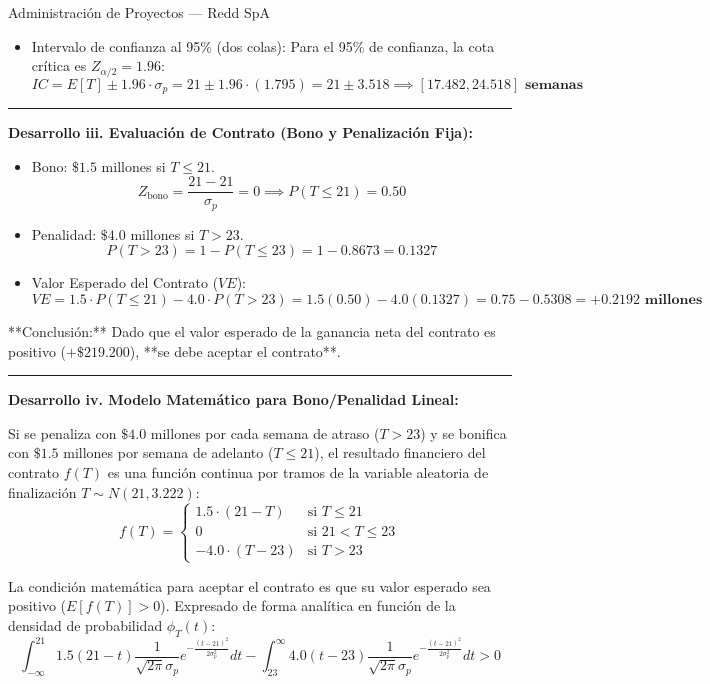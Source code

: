 \documentclass[11pt, a4paper]{article}
\begin{document}
\begin{ejercicio}{Administración de Proyectos --- Redd SpA}
\begin{itemize}
    \item Intervalo de confianza al 95\% (dos colas):
      Para el 95\% de confianza, la cota crítica es $Z_{\alpha/2} = 1.96$:
      \[
        IC = E[T] \pm 1.96 \cdot \sigma_p = 21 \pm 1.96 \cdot (1.795) = 21 \pm 3.518 \implies \mathbf{[17.482, 24.518] \text{ semanas}}
      \]
  \end{itemize}

  \rule{\textwidth}{0.2pt}

  \textbf{Desarrollo iii. Evaluación de Contrato (Bono y Penalización Fija):}
  \begin{itemize}
    \item Bono: $\$1.5$ millones si $T \le 21$.
      \[
        Z_{\text{bono}} = \frac{21 - 21}{\sigma_p} = 0 \implies P(T \le 21) = 0.50
      \]
    \item Penalidad: $\$4.0$ millones si $T > 23$.
      \[
        P(T > 23) = 1 - P(T \le 23) = 1 - 0.8673 = 0.1327
      \]
    \item Valor Esperado del Contrato ($VE$):
      \[
        VE = 1.5 \cdot P(T \le 21) - 4.0 \cdot P(T > 23) = 1.5(0.50) - 4.0(0.1327) = 0.75 - 0.5308 = \mathbf{+0.2192 \text{ millones}}
      \]
  \end{itemize}
  **Conclusión:** Dado que el valor esperado de la ganancia neta del contrato es positivo ($+\$219.200$), **se debe aceptar el contrato**.

  \rule{\textwidth}{0.2pt}

  \textbf{Desarrollo iv. Modelo Matemático para Bono/Penalidad Lineal:}

  Si se penaliza con $\$4.0$ millones por cada semana de atraso ($T > 23$) y se bonifica con $\$1.5$ millones por semana de adelanto ($T \le 21$), el resultado financiero del contrato $f(T)$ es una función continua por tramos de la variable aleatoria de finalización $T \sim N(21, 3.222)$:
  \[
    f(T) = \begin{cases}
      1.5 \cdot (21 - T) & \text{si } T \le 21 \\
      0 & \text{si } 21 < T \le 23 \\
      -4.0 \cdot (T - 23) & \text{si } T > 23
    \end{cases}
  \]

  La condición matemática para aceptar el contrato es que su valor esperado sea positivo ($E[f(T)] > 0$). Expresado de forma analítica en función de la densidad de probabilidad $\phi_T(t)$:
  \[
    \int_{-\infty}^{21} 1.5(21 - t) \frac{1}{\sqrt{2\pi}\sigma_p} e^{-\frac{(t-21)^2}{2\sigma_p^2}} dt - \int_{23}^{\infty} 4.0(t - 23) \frac{1}{\sqrt{2\pi}\sigma_p} e^{-\frac{(t-21)^2}{2\sigma_p^2}} dt > 0
  \]
\end{ejercicio}
\end{document}
